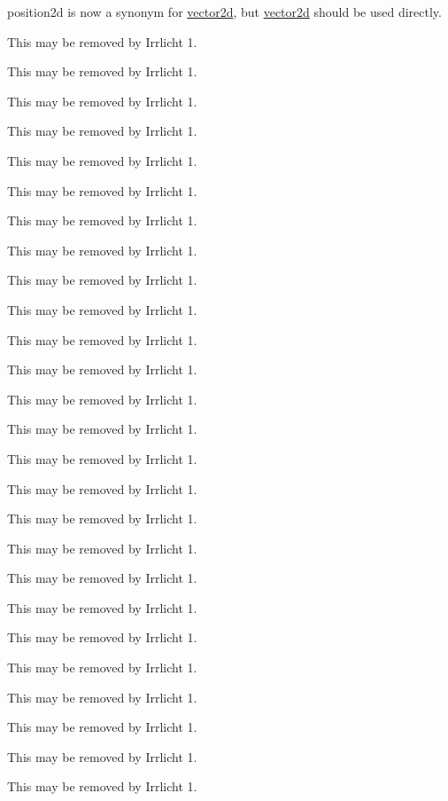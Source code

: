 \begin{DoxyRefList}
position2d is now a synonym for \hyperlink{classirr_1_1core_1_1vector2d}{vector2d}, but \hyperlink{classirr_1_1core_1_1vector2d}{vector2d} should be used directly.  
\item[\label{deprecated__deprecated000006}%
\Hypertarget{deprecated__deprecated000006}%
Member \hyperlink{namespaceirr_1_1gui_a27be6aa12d4985a5005983182fe99d56aa8686458f7f4b2eb27de52fea2250e2c}{irr\+:\+:gui\+:\+:E\+G\+D\+S\+\_\+\+M\+E\+S\+S\+A\+G\+E\+\_\+\+B\+O\+X\+\_\+\+H\+E\+I\+G\+HT} ]This may be removed by Irrlicht 1. 

This may be removed by Irrlicht 1. 

This may be removed by Irrlicht 1. 

This may be removed by Irrlicht 1. 

This may be removed by Irrlicht 1. 

This may be removed by Irrlicht 1. 

This may be removed by Irrlicht 1. 

This may be removed by Irrlicht 1. 

This may be removed by Irrlicht 1. 

This may be removed by Irrlicht 1. 

This may be removed by Irrlicht 1. 

This may be removed by Irrlicht 1. 

This may be removed by Irrlicht 1. 

This may be removed by Irrlicht 1. 

This may be removed by Irrlicht 1. 

This may be removed by Irrlicht 1. 

This may be removed by Irrlicht 1. 

This may be removed by Irrlicht 1. 

This may be removed by Irrlicht 1. 

This may be removed by Irrlicht 1. 

This may be removed by Irrlicht 1. 

This may be removed by Irrlicht 1. 

This may be removed by Irrlicht 1. 

This may be removed by Irrlicht 1. 

This may be removed by Irrlicht 1.  
\item[\label{deprecated__deprecated000005}%
\Hypertarget{deprecated__deprecated000005}%
Member \hyperlink{namespaceirr_1_1gui_a27be6aa12d4985a5005983182fe99d56a0ade91b37c22ba07165cdc7147fbc766}{irr\+:\+:gui\+:\+:E\+G\+D\+S\+\_\+\+M\+E\+S\+S\+A\+G\+E\+\_\+\+B\+O\+X\+\_\+\+W\+I\+D\+TH} ]This may be removed by Irrlicht 1. 


\end{DoxyRefList}
